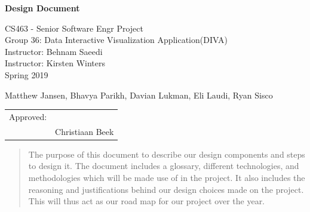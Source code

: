 \documentclass[journal,10pt,onecolumn,compsoc]{IEEEtran} \usepackage[margin=1.0in]{geometry} \usepackage{pdfpages}
\begin{document}
\begin{center}
  
  \textbf{}

  \vspace{2.5cm}
  \Huge{}
  \textbf{Design Document}
  \vspace{1.5cm}

 
  \LARGE
  CS463 - Senior Software Engr Project\\
  \vspace{0.25cm}
  Group 36: Data Interactive Visualization Application(DIVA)\\
  Instructor: Behnam Saeedi \\
  Instructor: Kirsten Winters \\
  \vspace{0.25cm}
  Spring 2019 \\
  \vspace{1cm}
  
  \large{Matthew Jansen, Bhavya Parikh, Davian Lukman, Eli Laudi, Ryan Sisco}\\
  \vspace{1cm}
  \vfill
  \begin{tabular}{@{}p{.8in}p{4in}@{}}
    Approved: & \hrulefill \\
    & Christiaan Beek \\
  \end{tabular}
  \vspace*{\fill}
   \begin{abstract}
      The purpose of this document to describe our design components and steps to design it. The document includes a glossary, different technologies, and methodologies which will be made use of in the project. It also includes the reasoning and justifications behind our design choices made on the project. This will thus act as our road map  for our project over the year.
       \noindent 
   \end{abstract}
   \normalsize 
  \end{center}
\newpage
\tableofcontents
\newpage
\end{document}
